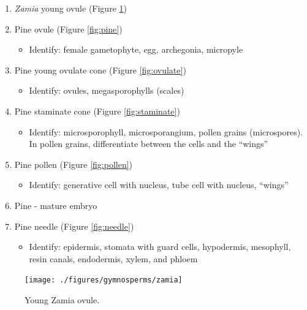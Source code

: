 \documentclass[]{book}
\providecommand{\tightlist}{%
  \setlength{\itemsep}{0pt}\setlength{\parskip}{0pt}}
\theoremstyle{definition}
\theoremstyle{definition}
\theoremstyle{definition}
\theoremstyle{remark}
\begin{document}
\begin{enumerate}
\def\labelenumi{\arabic{enumi}.}
\tightlist
\item
  \emph{Zamia} young ovule (Figure \ref{fig:zamia})
\item
  Pine ovule (Figure \ref{fig:pine})

  \begin{itemize}
  \tightlist
  \item
    Identify: female gametophyte, egg, archegonia, micropyle
  \end{itemize}
\item
  Pine young ovulate cone (Figure \ref{fig:ovulate})

  \begin{itemize}
  \tightlist
  \item
    Identify: ovules, megasporophylls (scales)
  \end{itemize}
\item
  Pine staminate cone (Figure \ref{fig:staminate})

  \begin{itemize}
  \tightlist
  \item
    Identify: microsporophyll, microsporangium, pollen grains
    (microspores). In pollen grains, differentiate between the cells and
    the ``wings''
  \end{itemize}
\item
  Pine pollen (Figure \ref{fig:pollen})

  \begin{itemize}
  \tightlist
  \item
    Identify: generative cell with nucleus, tube cell with nucleus,
    ``wings''
  \end{itemize}
\item
  Pine - mature embryo
\item
  Pine needle (Figure \ref{fig:needle})

  \begin{itemize}
  \tightlist
  \item
    Identify: epidermis, stomata with guard cells, hypodermis,
    mesophyll, resin canals, endodermis, xylem, and phloem
  \end{itemize}
\end{enumerate}

\begin{figure}

{\centering \texttt{[image: ./figures/gymnosperms/zamia]} 

}

\caption{Young Zamia ovule.}\label{fig:zamia}
\end{figure}
\end{document}
